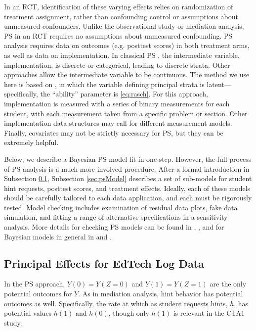 \documentclass{article}\usepackage[]{graphicx}\usepackage[]{color}
\begin{document}
In an RCT, identification of these varying effects relies on
randomization of treatment assignment,
rather than confounding control or assumptions about
unmeasured confounders.
Unlike the observational study or mediation analysis, PS in an RCT requires no assumptions about unmeasured confounding.
PS analysis requires data on outcomes
(e.g. posttest scores) in both treatment arms, as well as data on
implementation.
In classical PS
\citep[e.g.][]{page2012principal,feller2016compared}, the intermediate
variable, implementation, is discrete or categorical, leading to
discrete strata.
Other approaches \citep[e.g.]{gilbertHudgens,jin2008principal} allow
the intermediate variable to be continuous.
The method we use here is based on \citet{aoas}, in which the variable
defining principal strata is latent---specifically, the ``ability''
parameter is \eqref{eq:rasch}.
For this approach, implementation is measured with a series of binary
measurements for each student, with each measurement taken from a
specific problem or section.
Other implementation data structures may call for different
measurement models.
Finally, covariates may not be strictly necessary for PS, but they can be extremely helpful.

Below, we describe a Bayesian PS model fit in one step.
However, the full process of PS analysis is a much more involved
procedure.
After a formal introduction in Subsection \ref{sec:psIntro},
Subsection \ref{sec:psModel} describes a set of sub-models for student hint
requests, posttest scores, and treatment effects.
Ideally, each of these models should be carefully tailored to each
data application, and each must be rigorously tested.
Model checking includes examination of residual data plots, fake data
simulation, and fitting a range of alternative specifications in a
sensitivity analysis.
More details for checking PS models can be found in \citet{aoas},
\citet{psTutorial}, and for Bayesian models in general in
\citet{gelman2014bayesian} and \citet{mcelreath2020statistical}.

\subsection{Principal Effects for EdTech Log Data}\label{sec:psIntro}
In the PS approach, $Y(0)=Y(Z=0)$ and $Y(1)=Y(Z=1)$ are the only potential
outcomes for $Y$.
As in mediation analysis, hint behavior has potential outcomes as
well.
Specifically, the rate at which as student requests hints, $\bar{h}$,
has potential values $\bar{h}(1)$ and $\bar{h}(0)$,
though only $\bar{h}(1)$ is relevant in the CTA1 study.
\end{document}
